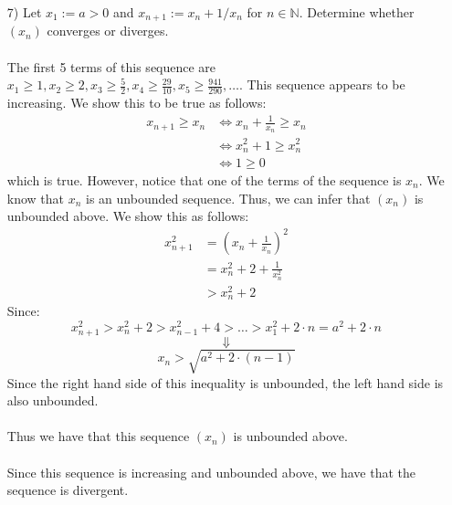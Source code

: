 \documentclass[12pt,letterpaper]{article}
\newcommand{\N}{\mathbb{N}}
\theoremstyle{case}
\theoremstyle{definition}
\begin{document}
\begin{enumerate}
\begin{enumerate}
\begin{enumerate}
\begin{proof}
				\\\\So,
				\begin{align*}
					x_{n+1} &= 1+\sqrt{x_n -1} \\
					&\geq 1+\sqrt{2 -1} \\
					&=1 + 1 \\
					&= 2
				\end{align*}
				Thus, $x_n \geq 2,\ \forall\ n \in \N$. By the definition of boundedness, we have that $(x_n)$ is bounded below by 2.
			\end{proof}
			
			Since we have also shown earlier that $(x_n)$ is monotone decreasing, we have that by the monotone sequence property, since $(x_n)$ is bounded, $(x_n)$ converges, and since $(x_n)$ is monotone decreasing, we have:
			\begin{align*}
				\lim (x_n) &= \inf \{x_n:n \in \N\} \\
				&=2
			\end{align*}
			
			\item[7)] Let $x_1 := a>0$ and $x_{n+1} := x_n+1/x_n$ for $n \in \N$. Determine whether $(x_n)$ converges or diverges.
			\\\\The first 5 terms of this sequence are $x_1 \geq 1, x_2 \geq 2, x_3 \geq \frac{5}{2}, x_4 \geq \frac{29}{10}, x_5 \geq \frac{941}{290}, \dots$. This sequence appears to be increasing. We show this to be true as follows:
			\begin{align*}
				x_{n+1} \geq x_n &\iff x_n + \frac{1}{x_n} \geq x_n \\
				&\iff x_n^2 + 1 \geq x_n^2 \\
				&\iff 1 \geq 0
			\end{align*}
			which is true.
			However, notice that one of the terms of the sequence is $x_n$. We know that $x_n$ is an unbounded sequence. Thus, we can infer that $(x_n)$ is unbounded above. We show this as follows:
			\begin{align*}
				x_{n+1}^2 &= \left(x_n + \frac{1}{x_n} \right)^2 \\
				&= x_n^2+2+\frac{1}{x_n^2} \\
				&> x_n^2 +2
			\end{align*}
			Since:
			\[x_{n+1}^2 > x_n^2+2 > x_{n-1}^2 +4 > \dots > x_1^2+2 \cdot n = a^2+2 \cdot n\]
			\[\Downarrow\]
			\[x_n > \sqrt{a^2 + 2 \cdot (n-1)}\]
			Since the right hand side of this inequality is unbounded, the left hand side is also unbounded.
			\\\\Thus we have that this sequence $(x_n)$ is unbounded above.
			\\\\Since this sequence is increasing and unbounded above, we have that the sequence is divergent.\\
			

\end{enumerate}
\end{enumerate}
\end{enumerate}
\end{document}
